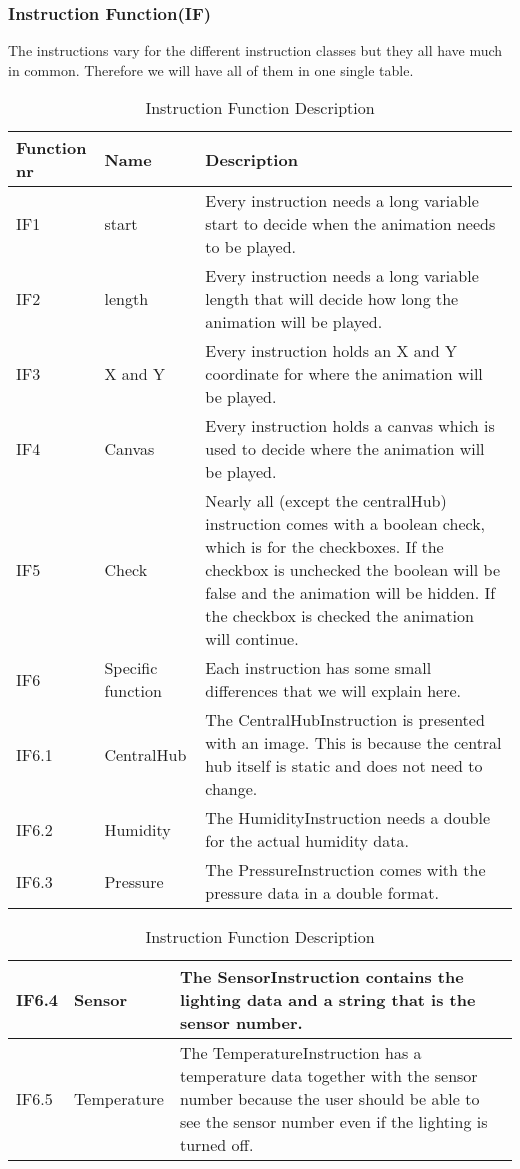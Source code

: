 \documentclass[../document]{subfiles}
\begin{document}
\subsubsection{Instruction Function(IF)}
The instructions vary for the different instruction classes but they all have much in common. Therefore we will have all of them in one single table.
\begin{table}[H]
\caption{Instruction Function Description}
\centering
\begin{tabularx}{\textwidth}{|l|l|X|}
	\hline
	Function nr
	&Name
	&Description
	\\ \hline IF1
	&start
	&Every instruction needs a long variable start to decide when the animation needs to be played.
	\\ \hline IF2
	&length
	&Every instruction needs a long variable length that will decide how long the animation will be played.
	\\ \hline IF3
	&X and Y
	&Every instruction holds an X and Y coordinate for where the animation will be played.
	\\ \hline IF4
	&Canvas
	&Every instruction holds a canvas which is used to decide where the animation will be played.
	\\ \hline IF5
	&Check
	&Nearly all (except the centralHub) instruction comes with a boolean check, which is for the checkboxes. If the checkbox is unchecked the boolean will be false and the animation will be hidden. If the checkbox is checked the animation will continue.
	\\ \hline IF6
	&Specific function
	&Each instruction has some small differences that we will explain here.
	\\ \hline IF6.1
	&CentralHub
	&The CentralHubInstruction is presented with an image. This is because the central hub itself is static and does not need to change.
	\\ \hline IF6.2
	&Humidity
	&The HumidityInstruction needs a double for the actual humidity data. 
	\\ \hline IF6.3
	&Pressure
	&The PressureInstruction comes with the pressure data in a double format.
	\\ \hline 
\end{tabularx}
\end{table}


\begin{table}[H]
\caption{Instruction Function Description}
\centering
\begin{tabularx}{\textwidth}{|l|l|X|}
	\hline
	IF6.4
	&Sensor
	&The SensorInstruction contains the lighting data and a string that is the sensor number.
	\\ \hline IF6.5
	&Temperature
	&The TemperatureInstruction has a temperature data together with the sensor number because the user should be able to see the sensor number even if the lighting is turned off.
	\\ \hline 
\end{tabularx}
\end{table}
\end{document}
